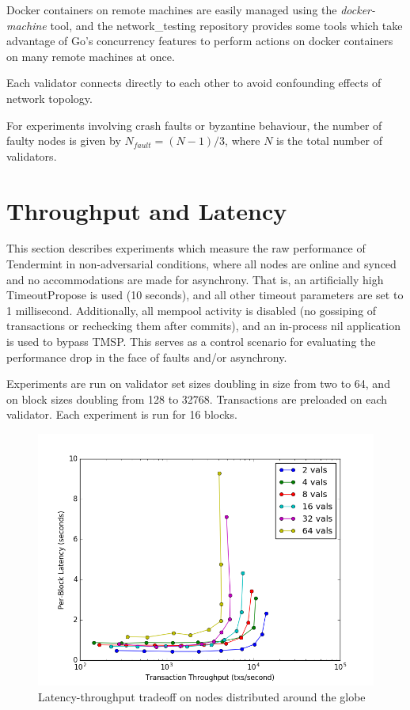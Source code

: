 Docker containers on remote machines are easily managed using the \emph{docker-machine} tool, 
and the network\_testing repository provides some tools which take advantage of Go's concurrency features
to perform actions on docker containers on many remote machines at once.

Each validator connects directly to each other to avoid confounding effects of network topology.

For experiments involving crash faults or byzantine behaviour, the number of faulty nodes is given by $N_{fault} = (N-1)/3$,
where $N$ is the total number of validators.

\section{Throughput and Latency}

This section describes experiments which measure the raw performance of Tendermint in non-adversarial conditions,
where all nodes are online and synced and no accommodations are made for asynchrony.
That is, an artificially high TimeoutPropose is used (10 seconds), and all other timeout parameters are set to 1 millisecond.
Additionally, all mempool activity is disabled (no gossiping of transactions or rechecking them after commits),
and an in-process nil application is used to bypass TMSP.
This serves as a control scenario for evaluating the performance drop in the face of faults and/or asynchrony.

Experiments are run on validator set sizes doubling in size from two to 64, and on block sizes doubling from 128 to 32768.
Transactions are preloaded on each validator. Each experiment is run for 16 blocks. 


\begin{figure}[]
	\includegraphics[width=\linewidth,height=\textheight,keepaspectratio]{figures/throughput/latency-throughput.png}
    	\centering
	\caption[Latency-throughput in non-faulty network]{Latency-throughput tradeoff on nodes distributed around the globe}
	\label{fig:exp_throughput_latency}
\end{figure}

